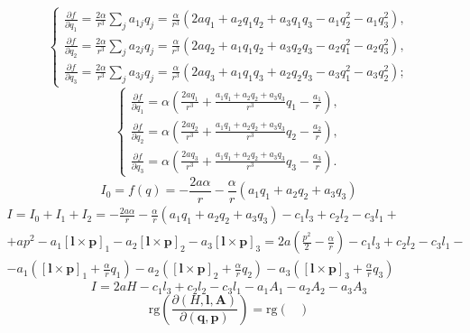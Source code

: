 \documentclass[12pt]{article}
\theoremstyle{definition}
\begin{document}
\begin{enumerate}
\begin{itemize}
\begin{itemize}
\begin{equation}
\begin{cases}
                \frac{\partial f}{\partial q_1}=\frac{2\alpha}{r^3}\sum\limits_ja_{1j}q_j=\frac{\alpha}{r^3}(2aq_1+a_2q_1q_2+a_3q_1q_3-a_1q_2^2-a_1q_3^2),\\
                \frac{\partial f}{\partial q_2}=\frac{2\alpha}{r^3}\sum\limits_ja_{2j}q_j=\frac{\alpha}{r^3}(2aq_2+a_1q_1q_2+a_3q_2q_3-a_2q_1^2-a_2q_3^2),\\
                \frac{\partial f}{\partial q_3}=\frac{2\alpha}{r^3}\sum\limits_ja_{3j}q_j=\frac{\alpha}{r^3}(2aq_3+a_1q_1q_3+a_2q_2q_3-a_3q_1^2-a_3q_2^2);
            \end{cases}
            \end{equation}
            \begin{equation}
            \begin{cases}
                \frac{\partial f}{\partial q_1}=\alpha(\frac{2aq_1}{r^3}+\frac{a_1q_1+a_2q_2+a_3q_3}{r^3}q_1-\frac{a_1}{r}),\\
                \frac{\partial f}{\partial q_2}=\alpha(\frac{2aq_2}{r^3}+\frac{a_1q_1+a_2q_2+a_3q_3}{r^3}q_2-\frac{a_2}{r}),\\
                \frac{\partial f}{\partial q_3}=\alpha(\frac{2aq_3}{r^3}+\frac{a_1q_1+a_2q_2+a_3q_3}{r^3}q_3-\frac{a_3}{r}).
            \end{cases}
            \end{equation}
            \begin{equation}
                I_0=f(q)=-\frac{2a\alpha}{r}-\frac{\alpha}{r}(a_1q_1+a_2q_2+a_3q_3)
            \end{equation}
            \begin{multline}
                I=I_0+I_1+I_2=-\frac{2a\alpha}{r}-\frac{\alpha}{r}(a_1q_1+a_2q_2+a_3q_3)-c_1l_3+c_2l_2-c_3l_1+\\+ap^2-a_1[\bm{l}\times\bm{p}]_1-a_2[\bm{l}\times\bm{p}]_2-a_3[\bm{l}\times\bm{p}]_3=2a\left(\frac{p^2}{2}-\frac{\alpha}{r}\right)-c_1l_3+c_2l_2-c_3l_1-\\-a_1\left([\bm{l}\times\bm{p}]_1+\frac{\alpha}{r}q_1\right)-a_2\left([\bm{l}\times\bm{p}]_2+\frac{\alpha}{r}q_2\right)-a_3\left([\bm{l}\times\bm{p}]_3+\frac{\alpha}{r}q_3\right)
            \end{multline}
            \begin{equation}
                \boxed{I=2aH-c_1l_3+c_2l_2-c_3l_1-a_1A_1-a_2A_2-a_3A_3}
            \end{equation}
            \begin{equation}
                \text{rg}\left(\frac{\partial(H,\bm{l},\bm{A})}{\partial(\bm{q},\bm{p})}\right)=\text{rg}\begin{pmatrix}

\end{pmatrix}
\end{equation}
\end{itemize}
\end{itemize}
\end{enumerate}
\end{document}
